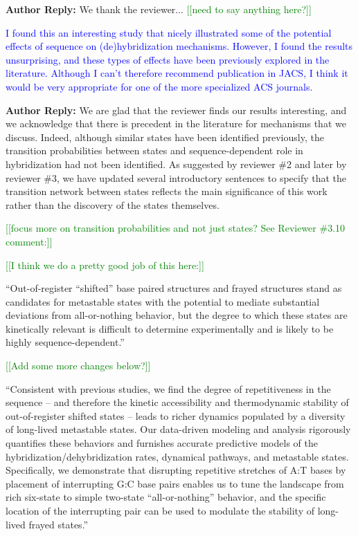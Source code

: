 \documentclass[11pt,a4paper]{letter} %
\newcommand*{\noteg}[1]{\textcolor{green}{[[#1]]}}		%
\begin{document}
\textbf{Author Reply:}   We thank the reviewer... \noteg{need to say anything here?}

\textcolor{blue}{I found this an interesting study that nicely illustrated some of the potential effects of sequence on (de)hybridization mechanisms. However, I found the results unsurprising, and these types of effects have been previously explored in the literature. Although I can't therefore recommend publication in JACS, I think it would be very appropriate for one of the more specialized ACS journals.}

\textbf{Author Reply:}  We are glad that the reviewer finds our results interesting, and we acknowledge that there is precedent in the literature for mechanisms that we discuss.  Indeed, although similar states have been identified previously, the transition probabilities between states and sequence-dependent role in hybridization had not been identified. As suggested by reviewer \#2 and later by reviewer \#3, we have updated several introductory sentences to specify that the transition network between states reflects the main significance of this work rather than the discovery of the states themselves. 

\noteg{focus more on transition probabilities and not just states? See Reviewer \#3.10 comment:}

\noteg{I think we do a pretty good job of this here:}

``Out-of-register ``shifted'' base paired structures \citep{Flamm2000RNAResolution, Romano2013DNADependence, Hinckley2014Coarse-grainedEffects, Maciejczyk2014DNAModel, Araque2016LatticeCooperativity, Xiao2019} and frayed structures \citep{Zgarbova2014BaseRNA, Nonin1995TerminalFraying, Nikolova2012ProbingSimulations, Andreatta2006UltrafastHelix} stand as candidates for metastable states with the potential to mediate substantial deviations from all-or-nothing behavior, but the degree to which these states are kinetically relevant is difficult to determine experimentally and is likely to be highly sequence-dependent.''

\noteg{Add some more changes below?}

``Consistent with previous studies, \citep{Hinckley2014Coarse-grainedEffects,Romano2013DNADependence,Araque2016LatticeCooperativity} we find the degree of repetitiveness in the sequence -- and therefore the kinetic accessibility and thermodynamic stability of out-of-register shifted states -- leads to richer dynamics populated by a diversity of long-lived metastable states. Our data-driven modeling and analysis rigorously quantifies these behaviors and furnishes accurate predictive models of the hybridization/dehybridization rates, dynamical pathways, and metastable states. Specifically, we demonstrate that disrupting repetitive stretches of A:T bases by placement of interrupting G:C base pairs enables us to tune the landscape from rich six-state to simple two-state ``all-or-nothing'' behavior, and the specific location of the interrupting pair can be used to modulate the stability of long-lived frayed states.''
\end{document}
